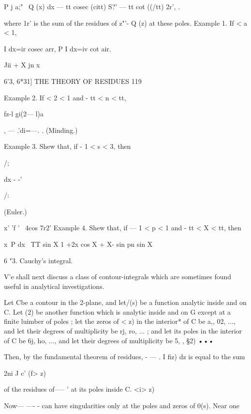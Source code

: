 P j a;"~  Q (x) dx — tt cosec (citt) S?' — tt cot ((/tt) 2r', 
. 

where 1r' is the sum of the residues of z"'-  Q (z) at these poles. 
Example 1. If < a < 1, 

I dx=ir cosec arr, P I dx=iv cot air. 

Jii  + X jn  x 



6'3, 6*31] THE THEORY OF RESIDUES 119 

Example 2. If < 2 < 1 and - tt < n < tt, 



  



fz-l  gi(2— l)a 

, — .'di=—. . (Minding.) 



Example 3. Shew that, if - 1 < s < 3, then 



/; 



  dx - -'  



/: 



(Euler.) 



   x' 'f ' ~4cos 7r2' 
Example 4. Shew that, if — 1 < p < 1 and - tt < X < tt, then 

x~P dx \  TT sin X 
1 +2x cos X + X- sin pn sin X 

6 "3. Cauchy's integral. 

 V'e shall next discuss a class of contour-integrals which are sometimes found useful 
in analytical investigations. 

Let Cbe a contour in the 2-plane, and let/(s) be a function analytic inside and on C. 
Let (2) be another function which is analytic inside and on G except at a finite luimber 
of poles ; let the zeros of <  z) in the interior* of C be a,, 02, ..., and let their degrees of 
multiplicity be rj, ro, ... ; and let its poles in the interior of C be 6j, ho, ..., and let their 
degrees of multiplicity be 5, , §2)  ••• 

Then, by the fundamental theorem of residues, - — . I fiz) dz is equal to the sum 

 2ni J c' (f> z) 

of the residues of--—   ' at its poles inside C. 
<i> z) 

Now— —- - can have singularities only at the poles and zeros of 0(s). Near one 

